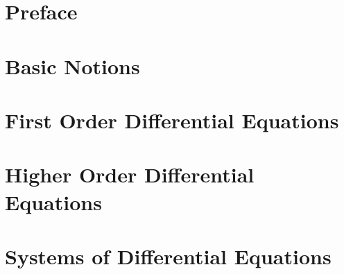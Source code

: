 \documentclass[oneside]{book}
\begin{document}
\pagebreak

\tableofcontents

\setcounter{tocdepth}{4}
\setcounter{secnumdepth}{4}

\pagebreak

\chapter*{Preface}



\mainmatter

\begin{savequote}

\end{savequote}
\chapter{Basic Notions} \label{chapter:basicnotions}

    

\begin{savequote}

\end{savequote}
\chapter{First Order Differential Equations} \label{chapter:firstorder}

    

\begin{savequote}

\end{savequote}
\chapter{Higher Order Differential Equations} \label{chapter:secondorder}

    

\begin{savequote}

\end{savequote}
\chapter{Systems of Differential Equations} \label{chapter:systems}

    
\end{document}
